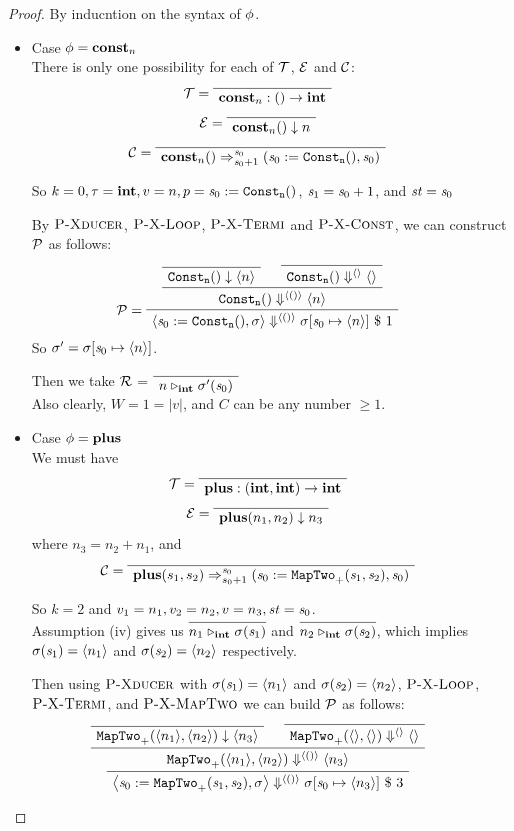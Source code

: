\begin{proof}
By inducntion on the syntax of $\phi$.
\begin{itemize}
	\item \label{thm-case-const} Case $\phi = \mathbf{const}_{n}$ \\ 	
	There is only one possibility for each of $\mathcal{T}$, $\mathcal{E}$ and $\mathcal{C}$:
	$$\MT = \PT{ \Axiom{\Typef{\constn{n}}{}{\int}}}$$
	$$\ME = \PT{\Axiom{\EvalF{\constn{n}}{}{n}}}$$
	$$\MC = \PT{\Axiom{\Transf{\constn{n}}{}{\s_0}{\s_0+1}
			{\sfun{\sdef{\s_0}{\constaf{n}}}{\s_0}}}}$$

\def\pconst{\sdef{\s_0}{\constaf{n}}}
	So $k=0,\tau = \int, v = n, p = \pconst$, $\mathit{s}_1 = \mathit{s}_0+1$, and $\mathit{st} = \mathit{s}_0$

	By $\textsc{P-Xducer}$, $\textsc{P-X-Loop}$, $\textsc{P-X-Termi}$ and $\textsc{P-X-Const}$, we can construct $\mathcal{P}$ as follows:
	$$\PT{
		\Axiom{\blockf{\consta{n}}{}{\singl{n}}}
		\Axiom{\sevalfg{\consta{n}}{}{\emptyv}{\emptyv}}
		\BC{\sevalfg{\consta{n}}{}{\vunit}{\singl{n}}}
		\LeLa{\MP = }
		\UC{\seval{\pconst}{\sgm}{\vunit}{\sgm[\s_0 \|-> \singl{n}]}{1}}			
	}$$
	So $\sgm' = \sgm[\s_0 \|-> \singl{n}]$.
	
	Then we take $\mathcal{R}$ = $\PT{\Axiom{\ValRep{n}{\int}{\sgm'(\s_0)}}}$ \\
	Also clearly, $ W = 1 = |v|$, and  $C$ can be any number $\ge 1$.
	
		
	\item \label{thm-case-plus} Case $\phi = \mathbf{plus}$ \\ 	
	We must have 
	$$\MT = \PT{\Axiom{\Typef{\plusn}{\int,\int}{\int}}}$$
	$$\ME = \PT{\Axiom{\EvalF{\plusn}{n_1,n_2}{n_3}}}$$ where $n_3 = n_2 + n_1$, and 
	$$\MC = \PT{\Axiom{\Transf{\plusn}{s_1,s_2}{\s_0}{s_0+1}
			{\sfun{\sdef{\s_0}{\maptwof{+}{\s_1}{\s_2}}}}{\s_0}}}$$

\def\pplus{\sdef{\s_0}{\maptwof{+}{\s_1}{\s_2}}}	
	So $k=2$ and $v_1= n_1, v_2= n_2, v = n_3, \mathit{st} = \mathit{s}_0$. \\
	 
	 Assumption (iv) gives us
	 $\infer{\ValRep{n_1}{\int}{\sgm(\s_1)}}{}$ and 
	 $\infer{\ValRep{n_2}{\int}{\sgm(\s_2)}}{}$, which implies
	 $\sigma(\mathit{s}_1) = \langle n_1 \rangle$ and $\sigma(\mathit{s}_2) = \langle n_2 \rangle$ respectively. 
	 
	 
	 Then using $\textsc{P-Xducer}$ with $\sigma(\mathit{s}_1)= \langle n_1 \rangle$ and $ \sigma(\mathit{s}_2) = \langle n_2 \rangle$,  $\textsc{P-X-Loop}$, $\textsc{P-X-Termi}$,
	 and $\textsc{P-X-MapTwo}$ 
	 we can build $\mathcal{P}$ as follows: 
	 $$\PT{
		\Axiom{\blockf{\maptwo{+}}{\singl{n_1}, \singl{n_2}}{\singl{n_3}}}
		\Axiom{\sevalfg{\maptwo{+}}{\emptyv,\emptyv}{\emptyv}{\emptyv}}
		\BC{\sevalfg{\maptwo{+}}{\singl{n_1},\singl{n_2}}{\vunit}{\singl{n_3}}}
		\UC{\seval{\pplus}{\sgm}{\vunit}{\sgm[\s_0 \|-> \singl{n_3}]}{3}}
	 }$$  
		

\end{itemize}
\end{proof}
